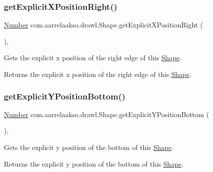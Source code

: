 \subsubsection{\texorpdfstring{get\+Explicit\+X\+Position\+Right()}{getExplicitXPositionRight()}}
{\footnotesize\ttfamily \hyperlink{interfacecom_1_1aarrelaakso_1_1drawl_1_1_number}{Number} com.\+aarrelaakso.\+drawl.\+Shape.\+get\+Explicit\+X\+Position\+Right (\begin{DoxyParamCaption}{ }\end{DoxyParamCaption})\hspace{0.3cm}{\ttfamily [protected]}, {\ttfamily [inherited]}}



Gets the explicit x position of the right edge of this \hyperlink{classcom_1_1aarrelaakso_1_1drawl_1_1_shape}{Shape}. 

\begin{DoxyReturn}{Returns}
the explicit x position of the right edge of this \hyperlink{classcom_1_1aarrelaakso_1_1drawl_1_1_shape}{Shape}. 
\end{DoxyReturn}
\mbox{\label{classcom_1_1aarrelaakso_1_1drawl_1_1_shape_a28b8e03381be6afdc7c5c8da48c80afe}} 
\subsubsection{\texorpdfstring{get\+Explicit\+Y\+Position\+Bottom()}{getExplicitYPositionBottom()}}
{\footnotesize\ttfamily \hyperlink{interfacecom_1_1aarrelaakso_1_1drawl_1_1_number}{Number} com.\+aarrelaakso.\+drawl.\+Shape.\+get\+Explicit\+Y\+Position\+Bottom (\begin{DoxyParamCaption}{ }\end{DoxyParamCaption})\hspace{0.3cm}{\ttfamily [protected]}, {\ttfamily [inherited]}}



Gets the explicit y position of the bottom of this \hyperlink{classcom_1_1aarrelaakso_1_1drawl_1_1_shape}{Shape}. 

\begin{DoxyReturn}{Returns}
the explicit y position of the bottom of this \hyperlink{classcom_1_1aarrelaakso_1_1drawl_1_1_shape}{Shape}. 
\end{DoxyReturn}
\mbox{\label{classcom_1_1aarrelaakso_1_1drawl_1_1_shape_a1e46cc626d5f5e1360d9d35d23cc50ea}} 
